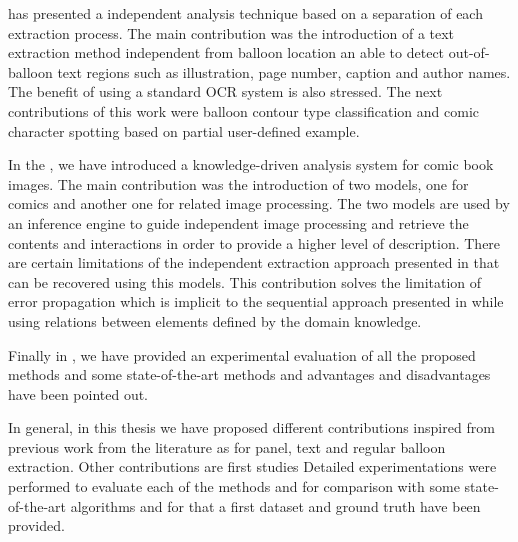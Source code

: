  has presented a independent analysis technique based on a separation of each extraction process.
The main contribution was the introduction of a text extraction method independent from balloon location an able to detect out-of-balloon text regions such as illustration, page number, caption and author names.
The benefit of using a standard OCR system is also stressed.
The next contributions of this work were balloon contour type classification and comic character spotting based on partial user-defined example.

In the , we have introduced a knowledge-driven analysis system for comic book images.
The main contribution was the introduction of two models, one for comics and another one for related image processing.
The two models are used by an inference engine to guide independent image processing and retrieve the contents and interactions in order to provide a higher level of description.
There are certain limitations of the independent extraction approach presented in  that can be recovered using this models.
This contribution solves the limitation of error propagation which is implicit to the sequential approach presented in  while using relations between elements defined by the domain knowledge.

Finally in , we have provided an experimental evaluation of all the proposed methods and some state-of-the-art methods and advantages and disadvantages have been pointed out.

In general, in this thesis we have proposed different contributions inspired from previous work from the literature as for panel, text and regular balloon extraction.
Other contributions are first studies 
Detailed experimentations were performed to evaluate each of the methods and for comparison with some state-of-the-art algorithms and for that a first dataset and ground truth have been provided.


